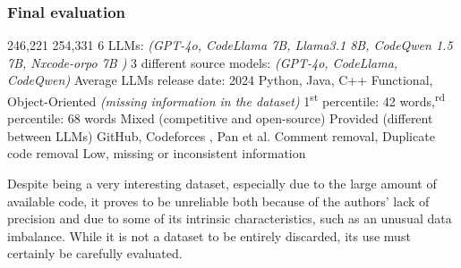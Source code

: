 


\clearpage %

\subsubsection*{Final evaluation}

\expandafter\def\csname CoDetM4HumanCode\endcsname{246,221}
\expandafter\def\csname CoDetM4LLMCode\endcsname{254,331}
\expandafter\def\csname CoDetM4NumLLMs\endcsname{6 LLMs: \textit{(GPT-4o, CodeLlama 7B, Llama3.1 8B, CodeQwen 1.5 7B, Nxcode-orpo 7B )}}
\expandafter\def\csname CoDetM4LLMDiversity\endcsname{3 different source models: \textit{(GPT-4o, CodeLlama, CodeQwen) }}
\expandafter\def\csname CoDetM4CurrentUse\endcsname{Average LLMs release date: 2024}
\expandafter\def\csname CoDetM4Languages\endcsname{Python, Java, C++}
\expandafter\def\csname CoDetM4CodeTypes\endcsname{Functional, Object-Oriented \textit{(missing information in the dataset)}}
\expandafter\def\csname CoDetM4CodeSize\endcsname{1\textsuperscript{st} percentile: 42 words,\textsuperscript{rd} percentile: 68 words}
\expandafter\def\csname CoDetM4CodeContext\endcsname{Mixed (competitive and open-source)}
\expandafter\def\csname CoDetM4Prompts\endcsname{Provided (different between LLMs)}
\expandafter\def\csname CoDetM4Sources\endcsname{GitHub, Codeforces \cite{CodeforcesKaggle}, Pan et al. \cite{pan2024assessing}}
\expandafter\def\csname CoDetM4CodeQuality\endcsname{Comment removal, Duplicate code removal}
\expandafter\def\csname CoDetM4Reliability\endcsname{Low, missing or inconsistent information}




Despite being a very interesting dataset, 
especially due to the large amount of available code, 
it proves to be unreliable both because of the authors' 
lack of precision and due to some of its intrinsic 
characteristics, such as an unusual data imbalance. 
While it is not a dataset to be entirely discarded, 
its use must certainly be carefully evaluated.